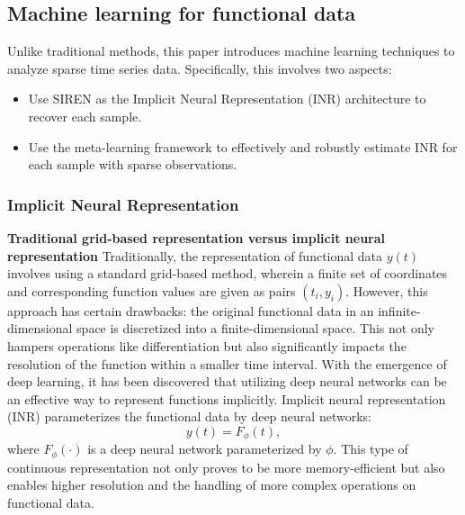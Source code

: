 \documentclass{article}
\begin{document}
\subsection{Machine learning for functional data}
Unlike traditional methods, this paper introduces machine learning techniques to analyze sparse time series data. 
Specifically, this involves two aspects:
\begin{itemize}
  \item Use SIREN as the Implicit Neural Representation (INR) \cite{sitzmann2020implicit} architecture to recover each sample.
  \item Use the meta-learning framework to effectively and robustly estimate INR for each sample with sparse observations.
\end{itemize}

\subsubsection{Implicit Neural Representation}

\textbf{Traditional grid-based representation versus implicit neural representation}
Traditionally, the representation of functional data $y(t)$ involves using a standard grid-based method, 
wherein a finite set of coordinates and corresponding function values are given as pairs $(t_i, y_i)$. 
However, this approach has certain drawbacks: the original functional data in an infinite-dimensional space is discretized into a finite-dimensional space. 
This not only hampers operations like differentiation but also significantly impacts the resolution of the function within a smaller time interval.
With the emergence of deep learning, it has been discovered that utilizing deep neural networks can be an effective way to represent functions implicitly.
Implicit neural representation (INR) parameterizes the functional data by deep neural networks:
$$y(t)=F_\phi(t), $$
where $F_\phi(\cdot)$ is a deep neural network parameterized by $\phi$.
This type of continuous representation not only proves to be more memory-efficient but also enables higher resolution and the handling of more complex operations on functional data.
\end{document}
